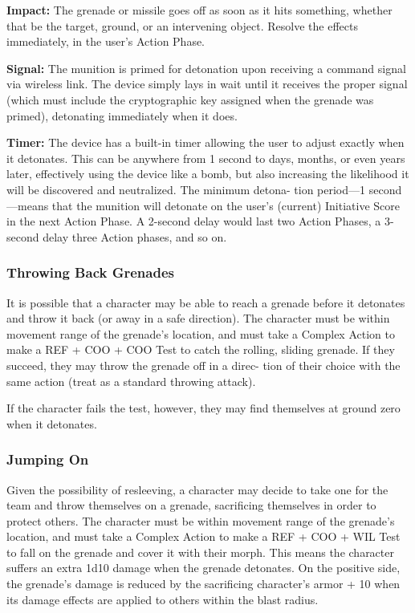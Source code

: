 \textbf{Impact:} The grenade or missile goes off as soon as it 
hits something, whether that be the target, ground, or 
an intervening object. Resolve the effects immediately, 
in the user's Action Phase.

\textbf{Signal:} The munition is primed for detonation upon 
receiving a command signal via wireless link. The 
device simply lays in wait until it receives the proper 
signal (which must include the cryptographic key 
assigned when the grenade was primed), detonating 
immediately when it does.

\textbf{Timer:} The device has a built-in timer allowing 
the user to adjust exactly when it detonates. This 
can be anywhere from 1 second to days, months, or 
even years later, effectively using the device like a 
bomb, but also increasing the likelihood it will be 
discovered and neutralized. The minimum detona-
tion period—1 second—means that the munition will 
detonate on the user's (current) Initiative Score in the 
next Action Phase. A 2-second delay would last two 
Action Phases, a 3-second delay three Action phases, 
and so on.

\subsubsection{Throwing Back Grenades}

It is possible that a character may be able to reach 
a grenade before it detonates and throw it back (or 
away in a safe direction). The character must be 
within movement range of the grenade's location, and 
must take a Complex Action to make a REF + COO + 
COO Test to catch the rolling, sliding grenade. If they 
succeed, they may throw the grenade off in a direc-
tion of their choice with the same action (treat as a 
standard throwing attack).

If the character fails the test, however, they may find 
themselves at ground zero when it detonates.

\subsubsection{Jumping On}

Given the possibility of resleeving, a character may 
decide to take one for the team and throw themselves 
on a grenade, sacrificing themselves in order to protect 
others. The character must be within movement range 
of the grenade's location, and must take a Complex 
Action to make a REF + COO + WIL Test to fall on 
the grenade and cover it with their morph. This means 
the character suffers an extra 1d10 damage when the 
grenade detonates. On the positive side, the grenade's 
damage is reduced by the sacrificing character's armor 
+ 10 when its damage effects are applied to others 
within the blast radius.

